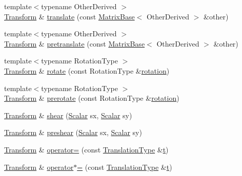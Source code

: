 \begin{DoxyCompactItemize}
\item 
{\footnotesize template$<$typename Other\-Derived $>$ }\\\hyperlink{class_transform}{Transform} \& \hyperlink{class_transform_a7e237d8ecf8099c9080fd68564f0217d}{translate} (const \hyperlink{class_matrix_base}{Matrix\-Base}$<$ Other\-Derived $>$ \&other)
\item 
{\footnotesize template$<$typename Other\-Derived $>$ }\\\hyperlink{class_transform}{Transform} \& \hyperlink{class_transform_a1fc2f9cb5325c8446e8d770785057819}{pretranslate} (const \hyperlink{class_matrix_base}{Matrix\-Base}$<$ Other\-Derived $>$ \&other)
\item 
{\footnotesize template$<$typename Rotation\-Type $>$ }\\\hyperlink{class_transform}{Transform} \& \hyperlink{class_transform_abc8df5aca2ac3ab5b50e5b875fd76f23}{rotate} (const Rotation\-Type \&\hyperlink{class_transform_a3d5324a4905c6c83465ae72afbdcf947}{rotation})
\item 
{\footnotesize template$<$typename Rotation\-Type $>$ }\\\hyperlink{class_transform}{Transform} \& \hyperlink{class_transform_a8a2103162e66bc2cd518d03c6db225a8}{prerotate} (const Rotation\-Type \&\hyperlink{class_transform_a3d5324a4905c6c83465ae72afbdcf947}{rotation})
\item 
\hyperlink{class_transform}{Transform} \& \hyperlink{class_transform_a38824bb67e04cba76d01a05309193deb}{shear} (\hyperlink{class_transform_a0468fefb805493a70f2100c7faf05489}{Scalar} sx, \hyperlink{class_transform_a0468fefb805493a70f2100c7faf05489}{Scalar} sy)
\item 
\hyperlink{class_transform}{Transform} \& \hyperlink{class_transform_a5eb931239c6162e94cbfd1263620724e}{preshear} (\hyperlink{class_transform_a0468fefb805493a70f2100c7faf05489}{Scalar} sx, \hyperlink{class_transform_a0468fefb805493a70f2100c7faf05489}{Scalar} sy)
\item 
\hyperlink{class_transform}{Transform} \& \hyperlink{class_transform_ad085cc600dede29fdf9c0dc11ef6c9ec}{operator=} (const \hyperlink{class_transform_adc0ae33868e7f2d468acc92d2d4c4b80}{Translation\-Type} \&\hyperlink{glext_8h_a00140d6f5c548b26daf170bf16e86a6d}{t})
\item 
\hyperlink{class_transform}{Transform} \& \hyperlink{class_transform_a5b316589bf65360228b85a9f4d611547}{operator$\ast$=} (const \hyperlink{class_transform_adc0ae33868e7f2d468acc92d2d4c4b80}{Translation\-Type} \&\hyperlink{glext_8h_a00140d6f5c548b26daf170bf16e86a6d}{t})

\end{DoxyCompactItemize}
